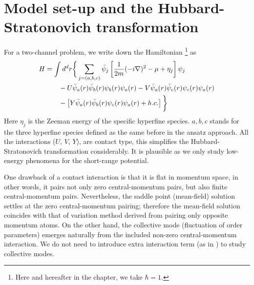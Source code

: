 \section{Model set-up and the Hubbard-Stratonovich transformation}
For a two-channel problem, we write down the Hamiltonian \footnote{Here and hereafter in the chapter, we take $\hbar=1$.} as
\begin{equation}\label{eq:pathInt2:ham2}
\begin{split}
H&=\int{d^{d}r}\bigg\{\sum_{j=(a,b,c)}\bar\psi_{j}\left[\frac{1}{2m}(-i\nabla)^{2}-\mu+\eta_{j}\right]\psi_{j}\\
	&\qquad-U\bar\psi_{a}(r)\bar\psi_{b}(r)\psi_{b}(r)\psi_{a}(r)-V\bar\psi_{a}(r)\bar\psi_{c}(r)\psi_{c}(r)\psi_{a}(r)\\
	&\qquad-\left[Y\bar\psi_{a}(r)\bar\psi_{b}(r)\psi_{c}(r)\psi_{a}(r)+h.c.\right]
	\bigg\}
\end{split}
\end{equation}
Here $\eta_{j}$ is the Zeeman energy of the specific hyperfine species.  $a,b,c$ stands for the three hyperfine species defined as the same before in the ansatz approach.  All the interactions ($U$, $V$, $Y$), are contact type, this simplifies the Hubbard-Stratonovich transformation considerably.  It is plausible as we only study low-energy phenomena for the short-range potential. 

One drawback of a contact interaction is that it is flat in momentum space, in other words, it pairs not only zero central-momentum pairs, but also finite central-momentum pairs.  Nevertheless, the saddle point (mean-field) solution settles at the zero central-momentum pairing; therefore the mean-field solution coincides with that of  variation method derived from pairing  only opposite momentum atoms.  On the other hand, the collective mode (fluctuation of order parameters) emerges naturally from the included non-zero central-momentum interaction.  We do not need to introduce extra interaction term (as in \cite{AndersonBCS}) to study collective modes.   

